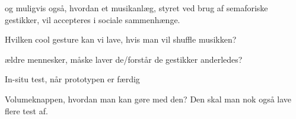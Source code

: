 og muligvis også, hvordan et musikanlæg, styret ved brug af semaforiske gestikker, vil accepteres i sociale sammenhænge.  

Hvilken cool gesture kan vi lave, hvis man vil shuffle musikken?

ældre mennesker, måske laver de/forstår de gestikker anderledes?

In-situ test, når prototypen er færdig

Volumeknappen, hvordan man kan gøre med den? Den skal man nok også lave flere test af. 